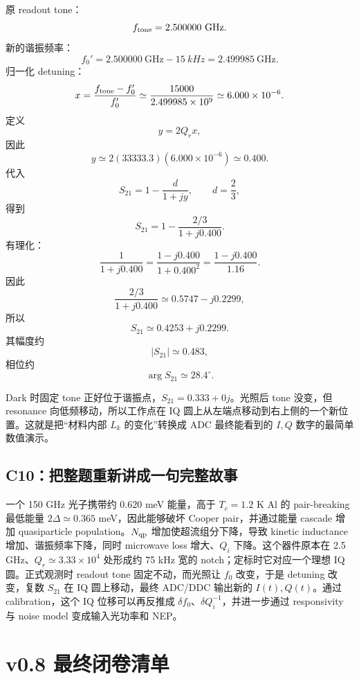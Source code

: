 \documentclass[11pt,a4paper,openany]{ctexrep}
\begin{document}
原 readout tone：
\[
f_{\rm tone}=2.500000\ \mathrm{GHz}.
\]
新的谐振频率：
\[
f_0'=2.500000\ \mathrm{GHz}-\SI{15}{kHz}
=2.499985\ \mathrm{GHz}.
\]
归一化 detuning：
\[
x=\frac{f_{\rm tone}-f_0'}{f_0'}
\simeq\frac{15000}{2.499985\times10^9}
\simeq6.000\times10^{-6}.
\]
定义
\[
y=2Q_r x,
\]
因此
\[
y\simeq2(33333.3)(6.000\times10^{-6})
\simeq0.400.
\]
代入
\[
S_{21}=1-\frac{d}{1+jy},
\qquad d=\frac23,
\]
得到
\[
S_{21}
=1-\frac{2/3}{1+j0.400}.
\]
有理化：
\[
\frac{1}{1+j0.400}
=\frac{1-j0.400}{1+0.400^2}
=\frac{1-j0.400}{1.16}.
\]
因此
\[
\frac{2/3}{1+j0.400}
\simeq0.5747-j0.2299,
\]
所以
\[
\boxed{
S_{21}\simeq0.4253+j0.2299
}.
\]
其幅度约
\[
|S_{21}|\simeq0.483,
\]
相位约
\[
\arg S_{21}\simeq28.4^\circ.
\]

\begin{answerbox}[title=为什么这个结果值得算？]
Dark 时固定 tone 正好位于谐振点，$S_{21}=0.333+0j$。光照后 tone 没变，但 resonance 向低频移动，所以工作点在 IQ 圆上从左端点移动到右上侧的一个新位置。这就是把“材料内部 $L_k$ 的变化”转换成 ADC 最终能看到的 $I,Q$ 数字的最简单数值演示。
\end{answerbox}

\subsection*{C10：把整题重新讲成一句完整故事}

一个 150 GHz 光子携带约 $0.620$ meV 能量，高于 $T_c=1.2$ K Al 的 pair-breaking 最低能量 $2\Delta\simeq0.365$ meV，因此能够破坏 Cooper pair，并通过能量 cascade 增加 quasiparticle population。$N_{\rm qp}$ 增加使超流组分下降，导致 kinetic inductance 增加、谐振频率下降，同时 microwave loss 增大、$Q_i$ 下降。这个器件原本在 2.5 GHz、$Q_r\simeq3.33\times10^4$ 处形成约 75 kHz 宽的 notch；定标时它对应一个理想 IQ 圆。正式观测时 readout tone 固定不动，而光照让 $f_0$ 改变，于是 detuning 改变，复数 $S_{21}$ 在 IQ 圆上移动，最终 ADC/DDC 输出新的 $I(t),Q(t)$。通过 calibration，这个 IQ 位移可以再反推成 $\delta f_0$、$\delta Q_i^{-1}$，并进一步通过 responsivity 与 noise model 变成输入光功率和 NEP。

\section{v0.8 最终闭卷清单}
\end{document}

